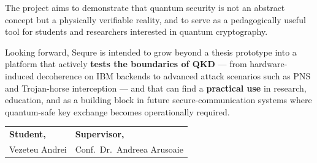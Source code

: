 \documentclass[12pt, a4paper]{article}
\begin{document}
The project aims to demonstrate that quantum security is not an abstract concept
but a physically verifiable reality, and to serve as a pedagogically useful tool
for students and researchers interested in quantum cryptography.

Looking forward, Sequre is intended to grow beyond a thesis prototype into
a platform that actively \textbf{tests the boundaries of QKD} --- from
hardware-induced decoherence on IBM backends to advanced attack scenarios
such as PNS and Trojan-horse interception --- and that can find a
\textbf{practical use} in research, education, and as a building block in
future secure-communication systems where quantum-safe key exchange becomes
operationally required.

\vspace{24pt}
\noindent
\begin{tabular}{@{}p{7cm}p{7cm}@{}}
  \textbf{Student,}          & \textbf{Supervisor,} \\[24pt]
  Vezeteu Andrei             & Conf.\ Dr.\ Andreea Arusoaie \\
\end{tabular}
\end{document}
